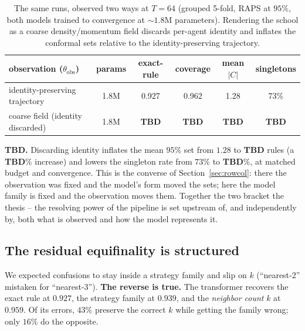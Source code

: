 \documentclass[11pt]{article}
\begin{document}
\begin{table}[t]
\centering
\small
\caption{The same runs, observed two ways at $T=64$ (grouped 5-fold, RAPS at $95\%$,
both models trained to convergence at ${\sim}1.8$M parameters). Rendering the school as
a coarse density/momentum field discards per-agent identity and inflates the conformal
sets relative to the identity-preserving trajectory.}
\label{tab:field}
\begin{tabular}{lccccc}
\toprule
observation ($\theta_{\mathrm{obs}}$) & params & exact-rule & coverage & mean $|C|$ & singletons \\
\midrule
identity-preserving trajectory & 1.8M & 0.927 & 0.962 & 1.28 & 73\% \\
coarse field (identity discarded) & 1.8M & \textbf{TBD} & \textbf{TBD} & \textbf{TBD} & \textbf{TBD} \\
\bottomrule
\end{tabular}
\end{table}

\textbf{TBD.} Discarding identity inflates the mean $95\%$ set from $1.28$ to
\textbf{TBD} rules (a \textbf{TBD}$\%$ increase) and lowers the singleton rate from
$73\%$ to \textbf{TBD}$\%$, at matched budget and convergence. This is the converse of
Section~\ref{sec:rowcol}: there the observation was fixed and the model's form moved the
sets; here the model family is fixed and the observation moves them. Together the two
bracket the thesis -- the resolving power of the pipeline is set upstream of, and
independently by, both what is observed and how the model represents it.

\subsection{The residual equifinality is structured}

We expected confusions to stay inside a strategy family and slip on $k$
(``nearest-2'' mistaken for ``nearest-3''). \textbf{The reverse is true.} The
transformer recovers the exact rule at $0.927$, the strategy family at $0.939$, and
the \emph{neighbor count} $k$ at $\mathbf{0.959}$. Of its errors, $43\%$ preserve the
correct $k$ while getting the family wrong; only $16\%$ do the opposite.
\end{document}
